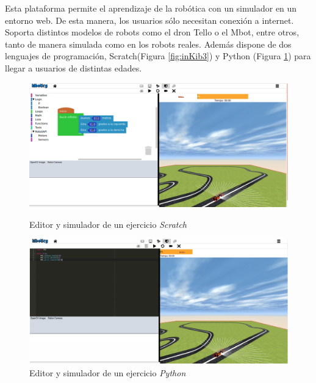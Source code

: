 Esta plataforma permite el aprendizaje de la robótica con un simulador en un entorno web. De esta manera, los usuarios sólo necesitan conexión a internet. Soporta distintos modelos de robots como el dron Tello o el Mbot, entre otros, tanto de manera simulada como en los robots reales. Además dispone de dos lenguajes de programación, Scratch(Figura \ref{fig:inKib3}) y Python (Figura \ref{fig:inKib4}) para llegar a usuarios de distintas edades.
\begin{figure}[!htb]
    \includegraphics[width=\linewidth]{figures/introduccion/kibotics3.png}
    \caption{Editor y simulador de un ejercicio \textit{Scratch}}\label{fig:inKib3}
\endminipage\hfill
{}
    \includegraphics[width=\linewidth]{figures/introduccion/kibotics4.png}
    \caption{Editor y simulador de un ejercicio \textit{Python}}\label{fig:inKib4}
\endminipage\hfill
\end{figure}
